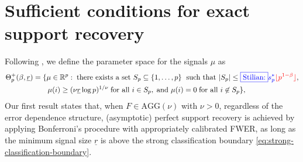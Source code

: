 


\section{Sufficient conditions for exact support recovery}
\label{subsec:sufficient}

Following \citet*{butucea2018variable}, we define the parameter space for the signals $\mu$ as
\begin{align} \label{eq:minimax-signal-config-over}
    \Theta_p^+(\beta, \underline{r}) &= \{\mu\in\mathbb{R}^p:\;\text{there exists a set }S_p\subseteq\{1,\ldots,p\}\;\text{ such that }|S_p|\le {\color{blue}\fbox{Stilian:} s_p^* }{\color{red}\lfloor p^{1-\beta}\rfloor}, \nonumber \\
    &\quad\quad\mu(i)\ge (\nu\underline{r}\log{p})^{1/\nu}\;\text{for all }i\in S_p,\;\text{and }\mu(i)=0\;\text{for all }i\not\in S_p\},
\end{align}
Our first result states that, when $F\in \text{AGG}(\nu)$ with $\nu>0$, regardless of the error dependence structure, (asymptotic) perfect support recovery is achieved by applying Bonferroni's procedure with appropriately calibrated FWER, as long as the minimum signal size $\underline{r}$ is above the strong classification boundary \eqref{eq:strong-classification-boundary}.

